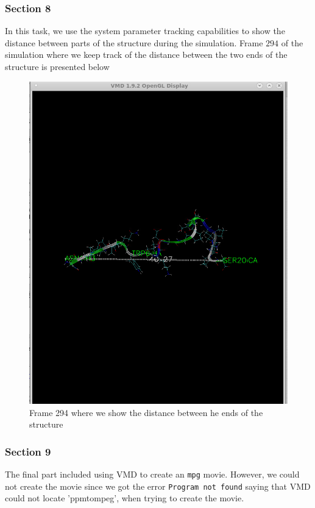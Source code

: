 \documentclass[11pt]{article}
\makeatletter
\def\maxwidth{\ifdim\Gin@nat@width>\linewidth\linewidth
    \else\Gin@nat@width\fi}
\let\Oldincludegraphics\includegraphics
\renewcommand{\includegraphics}[1]{\Oldincludegraphics[width=.8\maxwidth]{#1}}
\makeatother
\begin{document}
\subsubsection{Section 8}\label{section-8}

In this task, we use the system parameter tracking capabilities to show
the distance between parts of the structure during the simulation. Frame
\(294\) of the simulation where we keep track of the distance between
the two ends of the structure is presented below

\begin{figure}
\centering
\includegraphics{Screenshot_dist_ends.png}
\caption{Frame 294 where we show the distance between he ends of the
structure}
\end{figure}

\subsubsection{Section 9}\label{section-9}

The final part included using VMD to create an \texttt{mpg} movie.
However, we could not create the movie since we got the error
\texttt{Program\ not\ found} saying that VMD could not locate
'ppmtompeg', when trying to create the movie.
\end{document}
